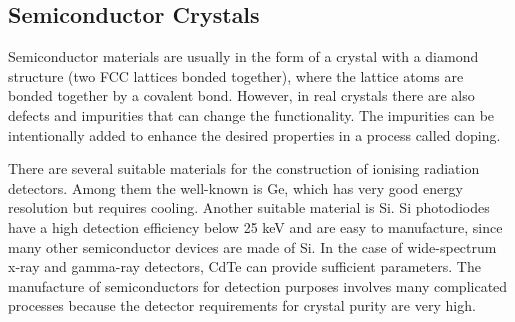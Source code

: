 \subsection{Semiconductor Crystals}
Semiconductor materials are usually in the form of a crystal with a diamond structure (two FCC lattices bonded together), where the lattice atoms are bonded together by a covalent bond. However, in real crystals there are also defects and impurities that can change the functionality. The impurities can be intentionally added to enhance the desired properties in a process called doping. 
\par
There are several suitable materials for the construction of ionising radiation detectors. Among them the well-known is Ge, which has very good energy resolution but requires cooling. Another suitable material is Si. Si photodiodes have a high detection efficiency below 25 keV and are easy to manufacture, since many other semiconductor devices are made of Si. In the case of wide-spectrum x-ray and gamma-ray detectors, CdTe can provide sufficient parameters. The manufacture of semiconductors for detection purposes involves many complicated processes because the detector requirements for crystal purity are very high.




 

